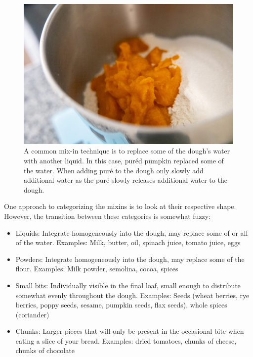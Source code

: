 \begin{figure}[htb!]
  \includegraphics[width=\textwidth]{pumpkin-on-flour}
  \caption[Pumpkin puré]{A common mix-in technique is to replace some of
    the dough's water with another liquid. In this case, puréd pumpkin replaced
    some of the water. When adding puré to the dough only slowly add
    additional water as the puré slowly releases additional water to the
    dough.}%
\end{figure}

One approach to categorizing the mixins is to look at their respective shape.
However, the transition between these categories is somewhat fuzzy:

\begin{itemize}
  \item Liquids: Integrate homogeneously into the dough, may replace some of
      or all of the water. Examples: Milk, butter, oil, spinach juice, tomato
      juice, eggs
  \item Powders: Integrate homogeneously into the dough, may replace some of
      the flour. Examples: Milk powder, semolina, cocoa, spices
  \item Small bits: Individually visible in the final loaf, small enough to
      distribute somewhat evenly throughout the dough. Examples: Seeds (wheat
      berries, rye berries, poppy seeds, sesame, pumpkin seeds,
      flax seeds), whole spices (coriander)
  \item Chunks: Larger pieces that will only be present in the occasional bite
      when eating a slice of your bread. Examples: dried tomatoes, chunks of
      cheese, chunks of chocolate
\end{itemize}


